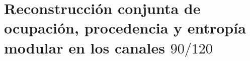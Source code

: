 \section{Reconstrucción conjunta de ocupación, procedencia y entropía modular en los canales \(90/120\)}

